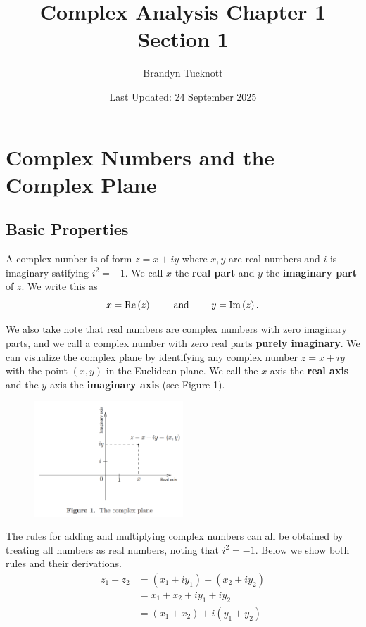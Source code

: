 \documentclass{exam}
\title{Complex Analysis Chapter 1 Section 1}
\author{Brandyn Tucknott}
\date{Last Updated: 24 September 2025}
\begin{document}
\maketitle

\section{Complex Numbers and the Complex Plane}
\subsection{Basic Properties}
A complex number is of form $z = x + iy$ where $x,y$ are real numbers and $i$ is imaginary
satifying $i^2 = -1$. We call $x$ the \textbf{real part} and $y$ the \textbf{imaginary part} 
of $z$. We write this as 
$$x = \text{Re}\left( z \right) \qquad \text{ and } \qquad y = \text{Im}\left( z \right).$$

We also take note that real numbers are complex numbers with zero imaginary parts, and we call a 
complex number with zero real parts \textbf{purely imaginary}. We can visualize the complex plane
by identifying any complex number $z = x + iy$ with the point $(x, y)$ in the Euclidean plane. We
call the $x$-axis the \textbf{real axis} and the $y$-axis the \textbf{imaginary axis} (see Figure 1).

\begin{figure}[H]
    \centering
    \includegraphics[width=0.5\textwidth]{figures/complex_analysis/figure_1.png}
\end{figure}

The rules for adding and multiplying complex numbers can all be obtained by treating all numbers as
real numbers, noting that $i^2 = -1$. Below we show both rules and their derivations.
\begin{align*}
    z_1 + z_2 &= (x_1 + iy_1) + (x_2 + iy_2) \\
    &= x_1 + x_2 + iy_1 + iy_2 \\
    &= (x_1 + x_2) + i(y_1 + y_2)
\end{align*}
\end{document}
